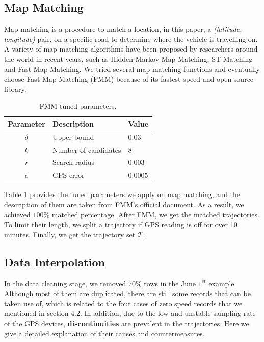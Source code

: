 \subsection{Map Matching}
Map matching\cite{mm} is a procedure to match a location, in this paper, a \textit{(latitude, longitude)} pair, on a specific road to determine where the vehicle is travelling on. A variety of map matching algorithms have been proposed by researchers around the world in recent years, such as Hidden Markov Map Matching\cite{HMMM}, ST-Matching\cite{stmm} and Fast Map Matching\cite{fmm}. We tried several map matching functions and eventually choose Fast Map Matching (FMM) because of its fastest speed and open-source library.

\begin{table}[htb]
  \begin{center}
      \caption{FMM tuned parameters.}
      \label{fmm_table}
      \begin{tabular}{cll}
          \toprule

          \textbf{Parameter} & \textbf{Description} & \textbf{Value}\\

          \midrule

          $\delta$ & Upper bound & $0.03$\\
          $k$ & Number of candidates & $8$\\
          $r$ & Search radius & $0.003$\\
          $e$ & GPS error & $0.0005$\\

          \bottomrule
      \end{tabular}
  \end{center}
\end{table}

Table \ref{fmm_table} provides the tuned parameters we apply on map matching, and the description of them are taken from FMM's official document. As a result, we achieved $100\%$ matched percentage. After FMM, we get the matched trajectories. To limit their length, we split a trajectory if GPS reading is off for over 10 minutes. Finally, we get the trajectory set $\mathcal{T}$.

\subsection{Data Interpolation}
In the data cleaning stage, we removed $70\%$ rows in the June $1^{st}$ example. Although most of them are duplicated, there are still some records that can be taken use of, which is related to the four cases of zero speed records that we mentioned in section 4.2. In addition, due to the low and unstable sampling rate of the GPS devices, \textbf{discontinuities} are prevalent in the trajectories. Here we give a detailed explanation of their causes and countermeasures.

